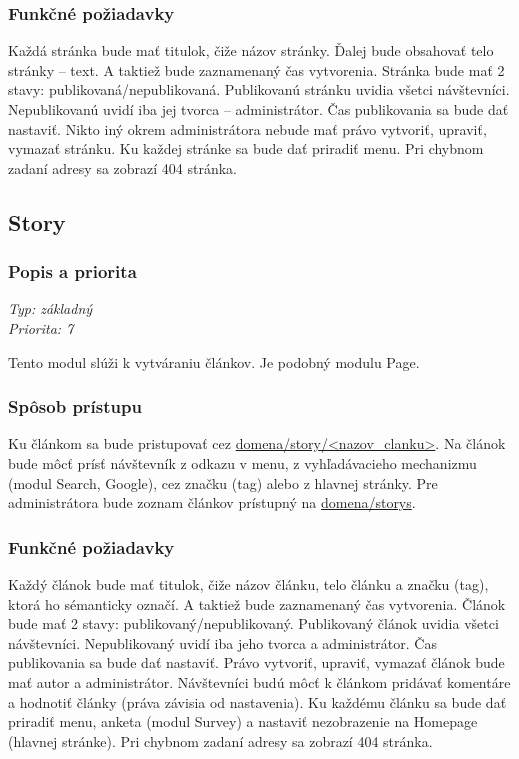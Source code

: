 \documentclass[a4paper,titlepage,11pt]{article}
\begin{document}
\subsubsection{Funkčné požiadavky}
Každá stránka bude mať titulok, čiže názov stránky. Ďalej bude obsahovať telo stránky -- text. 
A taktiež bude zaznamenaný čas vytvorenia. Stránka bude mať 2 stavy: publikovaná\slash nepublikovaná. 
Publikovanú stránku uvidia všetci návštevníci. Nepublikovanú uvidí iba jej tvorca -- administrátor. 
Čas publikovania sa bude dať nastaviť. Nikto iný okrem administrátora nebude mať právo vytvoriť, upraviť, vymazať stránku. 
Ku každej stránke sa bude dať priradiť menu. Pri chybnom zadaní adresy sa zobrazí 404 stránka.

\subsection{Story}
\subsubsection{Popis a priorita}
\begin{flushleft}
 \emph{Typ: základný}\\
 \emph{Priorita: 7}\\
\end{flushleft}
Tento modul slúži k vytváraniu článkov. Je podobný modulu Page. 
\subsubsection{Spôsob prístupu}
Ku článkom sa bude pristupovať cez \url{domena/story/<nazov_clanku>}.
Na článok bude môcť prísť návštevník z odkazu v menu, z vyhľadávacieho mechanizmu (modul Search, Google), cez značku (tag) alebo z hlavnej stránky. 
Pre administrátora bude zoznam článkov prístupný na \url{domena/storys}.
\subsubsection{Funkčné požiadavky}
Každý článok bude mať titulok, čiže názov článku, telo článku a značku (tag), ktorá ho sémanticky označí. 
A taktiež bude zaznamenaný čas vytvorenia. Článok bude mať 2 stavy: publikovaný\slash nepublikovaný. Publikovaný článok uvidia všetci návštevníci. 
Nepublikovaný uvidí iba jeho tvorca a administrátor. Čas publikovania sa bude dať nastaviť. 
Právo vytvoriť, upraviť, vymazať článok bude mať autor a administrátor. 
Návštevníci budú môcť k článkom pridávať komentáre a hodnotiť články (práva závisia od nastavenia). 
Ku každému článku sa bude dať priradiť menu, anketa (modul Survey) a nastaviť nezobrazenie na Homepage (hlavnej stránke).
Pri chybnom zadaní adresy sa zobrazí 404 stránka.
\end{document}
